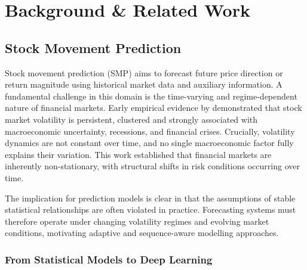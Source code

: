 \documentclass{l4proj}
\begin{document}



\chapter{Background \& Related Work}

\section{Stock Movement Prediction}

Stock movement prediction (SMP)  aims to forecast future price direction or return magnitude using historical market data and auxiliary information. A fundamental challenge in this domain is the time-varying and regime-dependent nature of financial markets. Early empirical evidence by \citet{https://doi.org/10.1111/j.1540-6261.1989.tb02647.x} demonstrated that stock market volatility is persistent, clustered and strongly associated with macroeconomic uncertainty, recessions, and financial crises. Crucially, volatility dynamics are not constant over time, and no single macroeconomic factor fully explains their variation. This work established that financial markets are inherently non-stationary, with structural shifts in risk conditions occurring over time.

The implication for prediction models is clear in that the assumptions of stable statistical relationships are often violated in practice. Forecasting systems must therefore operate under changing volatility regimes and evolving market conditions, motivating adaptive and sequence-aware modelling approaches.

\subsection{From Statistical Models to Deep Learning}
\end{document}
